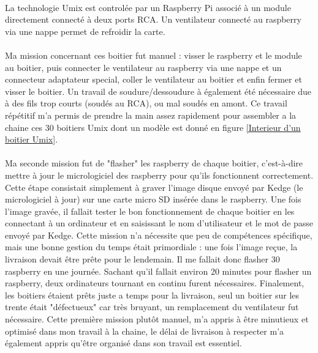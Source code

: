 \documentclass[12pt]{report}
\begin{document}
\paragraph{}
La technologie Umix est controlée par un Raspberry Pi associé à un module directement connecté à deux ports RCA. Un ventilateur connecté au raspberry via une nappe permet de refroidir la carte. 

\paragraph{}
Ma mission concernant ces boitier fut manuel : visser le raspberry et le module au boitier, puis connecter le ventilateur au raspberry via une nappe et un connecteur adaptateur special, coller le ventilateur au boitier et enfin fermer et visser le boitier. Un travail de soudure/dessoudure à également été nécessaire due à des fils trop courts (soudés au RCA), ou mal soudés en amont. Ce travail répétitif m'a permis de prendre la main assez rapidement pour assembler a la chaine ces 30 boitiers Umix dont un modèle est donné en figure \ref{Interieur d'un boitier Umix}.  

\paragraph{}
Ma seconde mission fut de "flasher" les raspberry de chaque boitier, c'est-à-dire mettre à jour le micrologiciel des raspberry pour qu'ils fonctionnent correctement. Cette étape consistait simplement à graver l'image disque envoyé par Kedge (le micrologiciel à jour) sur une carte micro SD insérée dans le raspberry. Une fois l'image gravée, il fallait tester le bon fonctionnement de chaque boitier en les connectant à un ordinateur et en saisissant le nom d'utilisateur et le mot de passe envoyé par Kedge. 
Cette mission n'a nécessite que peu de compétences spécifique, mais une bonne gestion du temps était primordiale : une fois l'image reçue, la livraison devait être prête pour le lendemain. Il me fallait donc flasher 30 raspberry en une journée. Sachant qu'il fallait environ 20 minutes pour flasher un raspberry, deux ordinateurs tournant en continu furent nécessaires. Finalement, les boitiers étaient prêts juste a temps pour la livraison, seul un boitier sur les trente était "défectueux" car très bruyant, un remplacement du ventilateur fut nécessaire. Cette première mission plutôt manuel, m'a appris à être minutieux et optimisé dans mon travail à la chaine, le délai de livraison à respecter m'a également appris qu'être organisé dans son travail est essentiel. 
\end{document}
